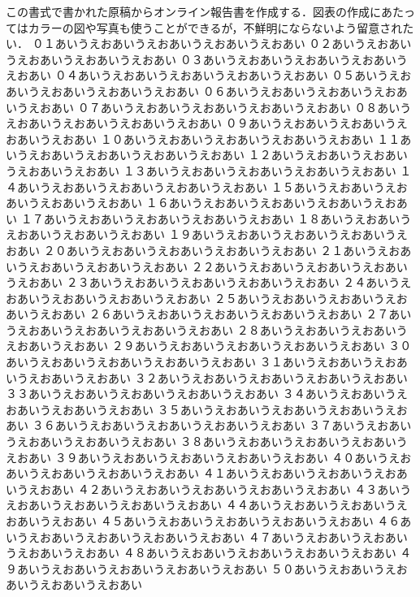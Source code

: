 \documentclass[a4j]{article}
\begin{document}
\fontsize{10.038pt}{15.056pt}\selectfont
この書式で書かれた原稿からオンライン報告書を作成する．図表の作成にあたってはカラーの図や写真も使うことができるが，不鮮明にならないよう留意されたい．
\newpage
\fontsize{10.038pt}{15.056pt}\selectfont
\noindent%
０１あいうえおあいうえおあいうえおあいうえおあい
０２あいうえおあいうえおあいうえおあいうえおあい
０３あいうえおあいうえおあいうえおあいうえおあい
０４あいうえおあいうえおあいうえおあいうえおあい
０５あいうえおあいうえおあいうえおあいうえおあい
０６あいうえおあいうえおあいうえおあいうえおあい
０７あいうえおあいうえおあいうえおあいうえおあい
０８あいうえおあいうえおあいうえおあいうえおあい
０９あいうえおあいうえおあいうえおあいうえおあい
１０あいうえおあいうえおあいうえおあいうえおあい
１１あいうえおあいうえおあいうえおあいうえおあい
１２あいうえおあいうえおあいうえおあいうえおあい
１３あいうえおあいうえおあいうえおあいうえおあい
１４あいうえおあいうえおあいうえおあいうえおあい
１５あいうえおあいうえおあいうえおあいうえおあい
１６あいうえおあいうえおあいうえおあいうえおあい
１７あいうえおあいうえおあいうえおあいうえおあい
１８あいうえおあいうえおあいうえおあいうえおあい
１９あいうえおあいうえおあいうえおあいうえおあい
２０あいうえおあいうえおあいうえおあいうえおあい
２１あいうえおあいうえおあいうえおあいうえおあい
２２あいうえおあいうえおあいうえおあいうえおあい
２３あいうえおあいうえおあいうえおあいうえおあい
２４あいうえおあいうえおあいうえおあいうえおあい
２５あいうえおあいうえおあいうえおあいうえおあい
２６あいうえおあいうえおあいうえおあいうえおあい
２７あいうえおあいうえおあいうえおあいうえおあい
２８あいうえおあいうえおあいうえおあいうえおあい
２９あいうえおあいうえおあいうえおあいうえおあい
３０あいうえおあいうえおあいうえおあいうえおあい
３１あいうえおあいうえおあいうえおあいうえおあい
３２あいうえおあいうえおあいうえおあいうえおあい
３３あいうえおあいうえおあいうえおあいうえおあい
３４あいうえおあいうえおあいうえおあいうえおあい
３５あいうえおあいうえおあいうえおあいうえおあい
３６あいうえおあいうえおあいうえおあいうえおあい
３７あいうえおあいうえおあいうえおあいうえおあい
３８あいうえおあいうえおあいうえおあいうえおあい
３９あいうえおあいうえおあいうえおあいうえおあい
４０あいうえおあいうえおあいうえおあいうえおあい
４１あいうえおあいうえおあいうえおあいうえおあい
４２あいうえおあいうえおあいうえおあいうえおあい
４３あいうえおあいうえおあいうえおあいうえおあい
４４あいうえおあいうえおあいうえおあいうえおあい
４５あいうえおあいうえおあいうえおあいうえおあい
４６あいうえおあいうえおあいうえおあいうえおあい
４７あいうえおあいうえおあいうえおあいうえおあい
４８あいうえおあいうえおあいうえおあいうえおあい
４９あいうえおあいうえおあいうえおあいうえおあい
５０あいうえおあいうえおあいうえおあいうえおあい
\end{document}

